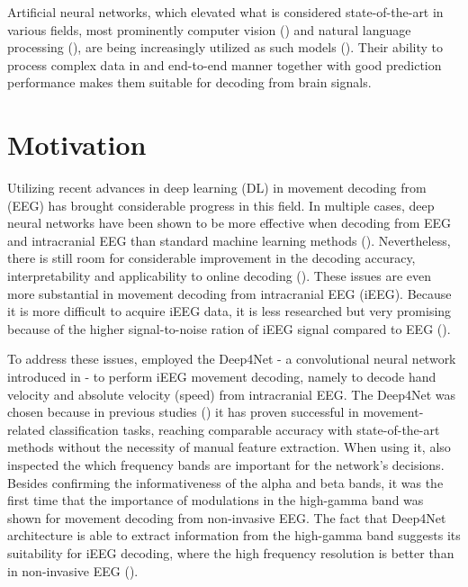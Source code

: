 Artificial neural networks, which elevated what is considered state-of-the-art  in various fields, most prominently computer vision (\cite{dnn-computer-vision}) and natural language processing (\cite{dnn-nlp}), are being increasingly utilized as such models (\cite{Roy-2019}). 
Their ability to process complex data in and end-to-end manner together with good prediction performance makes them suitable for decoding from brain signals. 


\section*{Motivation}
Utilizing recent advances in deep learning (DL) in movement decoding from (EEG) has brought considerable progress in this field.
In multiple cases, deep neural networks have been shown to be more effective when decoding from EEG and intracranial EEG than standard machine learning methods (\cite{Zhang-2019, lawhern-eegnet-2018, sleep-eegnet}).
Nevertheless, there is still room for considerable improvement in the decoding accuracy, interpretability and applicability to online decoding (\cite{Roy-2019}). 
These issues are even more substantial in movement decoding from intracranial EEG (iEEG). 
Because it is more difficult to acquire iEEG data, it is less researched but very promising because of the higher signal-to-noise ration of iEEG signal compared to EEG (\cite{volkova-review}). 

To address these issues, \cite{Hammer-2021} employed the Deep4Net - a convolutional neural network introduced in \cite{schirrmeister-deep-2017} - to perform iEEG movement decoding, namely to decode hand velocity and absolute velocity (speed) from intracranial EEG. 
The Deep4Net was chosen because in previous studies (\cite{schirrmeister-deep-2017, hartmann-hierarchical-2018}) it has proven successful in movement-related classification tasks, reaching comparable accuracy with state-of-the-art methods without the necessity of manual feature extraction.
When using it, \cite{schirrmeister-deep-2017} also inspected the which frequency bands are important for the network's decisions. Besides confirming the informativeness of the alpha and beta bands, it was the first time that the importance of modulations in the high-gamma band was shown for movement decoding from non-invasive EEG.
The fact that Deep4Net architecture is able to extract information from the high-gamma band suggests its suitability for iEEG decoding, where the high frequency resolution is better than in non-invasive EEG (\cite{gamma-eeg-bad-resolution}). 

